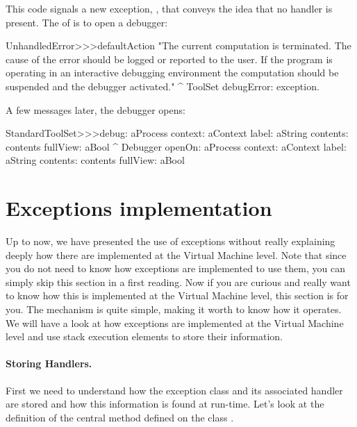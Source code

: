 \documentclass[a4paper,10pt,twoside]{book}
\begin{document}
This code signals a new exception, , that conveys the idea that no handler is present. The  of  is to open a debugger:

\begin{code}{}
UnhandledError>>>defaultAction
	"The current computation is terminated. The cause of the error should be logged or reported to the user. If the program is operating in an interactive debugging environment the computation should be suspended and the debugger activated."
	^ ToolSet debugError: exception.
\end{code}

\noindent
A few messages later, the debugger opens:

\begin{code}{}
StandardToolSet>>>debug: aProcess context: aContext label: aString contents: contents fullView: aBool
	^ Debugger openOn: aProcess context: aContext label: aString contents: contents fullView: aBool
\end{code}



\section{Exceptions implementation}
Up to now, we have presented the use of exceptions without really explaining deeply how there are implemented
at the Virtual Machine level. Note that since you do not need to know how exceptions are implemented 
to use them, you can simply skip this section in a first reading. Now if you are curious and really 
want to know how this is implemented at the Virtual Machine level, this section is for you. 
The mechanism is quite simple, making it worth to know how it operates. We will have a look at how exceptions are implemented at the Virtual Machine level and use stack execution elements to store their information.

\paragraph{Storing Handlers.}
First we need to understand how the exception class and its associated handler are stored and how this information is found at run-time. Let's look at the definition of the central method  defined on the class . 
\end{document}
